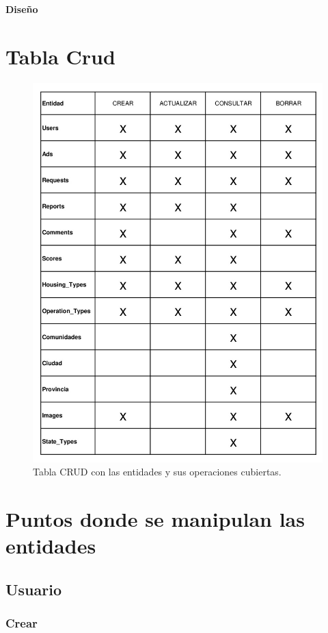 \newpage{\pagestyle{empty}\cleardoublepage}
\newpage
\vspace*{\fill}
    \begin{center}
      \thispagestyle{empty} \vspace*{0cm} \textbf{\huge
Dise\~{n}o}
    \end{center}
    \vspace*{\fill}
\newpage{\pagestyle{empty}\cleardoublepage}
\chapter{Tabla Crud}


\begin{figure}[h]
\centering
\includegraphics[width=.7\textwidth]{Img/Disenyo/TABLA_CRUD.jpg}
\caption{Tabla CRUD con las entidades y sus operaciones cubiertas.}
\label{fig:dcu}
\end{figure}

\chapter{Puntos donde se manipulan las entidades}

\section{Usuario}
\subsection{Crear}

